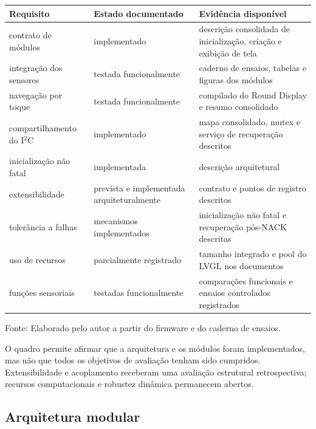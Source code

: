 \documentclass[a4paper,12pt]{article}
\newcommand{\fonteelemento}[1]{%
  \par\smallskip
  {\fontsize{10}{12}\selectfont\raggedright Fonte: #1.\par}%
}
\begin{document}
\begin{quadro}[H]
\centering
\caption{Estado dos requisitos da plataforma}
\label{qua:estado-requisitos}
\small
\begin{tabularx}{\textwidth}{|>{\raggedright\arraybackslash}p{}|>{\raggedright\arraybackslash}p{}|>{\raggedright\arraybackslash}X|}
\hline
\textbf{Requisito} & \textbf{Estado documentado} & \textbf{Evid\^encia dispon\'ivel} \\
\hline
contrato de m\'odulos & implementado & descri\c{c}\~ao consolidada de inicializa\c{c}\~ao, cria\c{c}\~ao e exibi\c{c}\~ao de tela \\
\hline
integra\c{c}\~ao dos sensores & testada funcionalmente & caderno de ensaios, tabelas e figuras dos m\'odulos \\
\hline
navega\c{c}\~ao por toque & testada funcionalmente & compilado do Round Display e resumo consolidado \\
\hline
compartilhamento do I$^2$C & implementado & mapa consolidado, mutex e servi\c{c}o de recupera\c{c}\~ao descritos \\
\hline
inicializa\c{c}\~ao n\~ao fatal & implementada & descri\c{c}\~ao arquitetural \\
\hline
extensibilidade & prevista e implementada arquiteturalmente & contrato e pontos de registro descritos \\
\hline
toler\^ancia a falhas & mecanismos implementados & inicializa\c{c}\~ao n\~ao fatal e recupera\c{c}\~ao p\'os-NACK descritas \\
\hline
uso de recursos & parcialmente registrado & tamanho integrado e pool do LVGL nos documentos \\
\hline
fun\c{c}\~oes sensoriais & testadas funcionalmente & compara\c{c}\~oes funcionais e ensaios controlados registrados \\
\hline
\end{tabularx}
\fonteelemento{Elaborado pelo autor a partir do firmware e do caderno de ensaios}
\end{quadro}


O quadro permite afirmar que a arquitetura e os m\'odulos foram implementados, mas n\~ao que todos os objetivos de avalia\c{c}\~ao tenham sido cumpridos. Extensibilidade e acoplamento receberam uma avalia\c{c}\~ao estrutural retrospectiva; recursos computacionais e robustez din\^amica permanecem abertos.


\subsection{Arquitetura modular}
\end{document}
